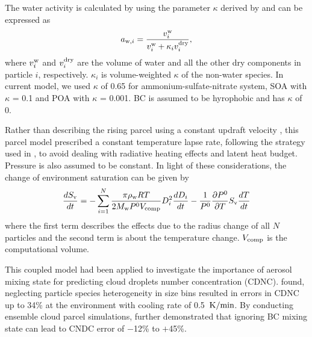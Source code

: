 \documentclass[edeposit,fullpage]{uiucthesis2009}
\makeatletter
\DeclareRobustCommand*\unit[1]
 {\ensuremath{%
   {\thinmuskip3mu\relax
    \def\mu{\text{\textmu}}\def~{\,}%
    \ifx\f@series\testbx\mathbf{#1}\else\mathrm{#1}\fi}}}
\makeatother
\begin{document}
The water activity is calculated by using the parameter $\kappa$ derived by \citet{Petters2007} and can be expressed as
\begin{equation}
\centering
a_{{\rm w},i} = \frac{v_i^{\rm w}}{v_i^{\rm w} + \kappa_i v_i^{\rm dry}},
\label{eq:activity coeff}    
\end{equation}
where $v_i^{\rm w}$ and $v_i^{\rm dry}$ are the volume of water and all the other dry components in particle $i$, respectively. $\kappa_i$ is volume-weighted $\kappa$ of the non-water species. In current model, we used $\kappa$ of 0.65 for ammonium-sulfate-nitrate system, SOA with $\kappa$ = 0.1 and POA with $\kappa$ = 0.001. BC is assumed to be hyrophobic and has $\kappa$ of 0. 

Rather than describing the rising parcel using a constant updraft velocity \citep{Seinfeld2016,rothenberg2016metamodeling}, this parcel model prescribed a constant temperature lapse rate, following the strategy used in \citet{majeed2001microphysics}, to avoid dealing with radiative heating effects and latent heat budget. Pressure is also assumed to be constant. In light of these considerations, the change of environment saturation can be given by
\begin{equation}
    \centering
    \frac{dS_{\rm v}}{dt} = -\sum_{i=1}^{N}\frac{\pi \rho_{\rm w} RT}{2M_{\rm w}P^0V_{\rm comp}}D_i^2\frac{dD_i}{dt} - \frac{1}{P^0}\frac{\partial P^0}{\partial T}S_{\rm v}\frac{dT}{dt}
\end{equation}
where the first term describes the effects due to the radius change of all $N$ particles and the second term is about the temperature change. $V_{\rm comp}$ is the computational volume. 

This coupled model had been applied to investigate the importance of aerosol mixing state for predicting cloud droplets number concentration (CDNC). \citet{ching2012impacts} found, neglecting particle species heterogeneity in size bins resulted in errors in CDNC up to 34\% at the environment with cooling rate of 0.5~\unit{K/min}. By conducting ensemble cloud parcel simulations, \citet{Ching2016} further demonstrated that ignoring BC mixing state can lead to CNDC error of $-$12\% to $+$45\%.

\end{document}
